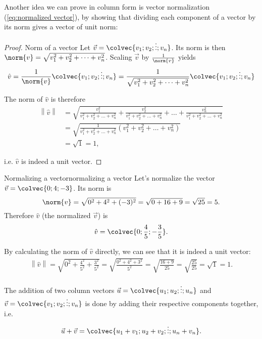 Another idea we can prove in column form is vector normalization (\autoref{eq:normalized vector}), by showing that dividing each component of a vector by its norm gives a vector of unit norm:
\begin{proof}{Norm of a vector}{}
	Let $\vec{v}=\colvec{v_{1};v_{2};\vdots;v_{n}}$. Its norm is then $\norm{v}=\sqrt{v_{1}^{2}+v_{2}^{2}+\dots+v_{n}^{2}}$. Scaling $\vec{v}$ by $\frac{1}{\norm{v}}$ yields
	\begin{equation*}
		\hat{v} = \frac{1}{\norm{v}}\colvec{v_{1};v_{2};\vdots;v_{n}} = \frac{1}{\sqrt{v_{1}^{2}+v_{2}^{2}+\dots+v_{n}^{2}}}\colvec{v_{1};v_{2};\vdots;v_{n}}
	\end{equation*}

	The norm of $\hat{v}$ is therefore
	\begin{align*}
		\left\| \hat{v} \right\| &= \sqrt{\frac{v_{1}^{2}}{v_{1}^{2}+v_{2}^{2}+\dots+v_{n}^{2}} + \frac{v_{2}^{2}}{v_{1}^{2}+v_{2}^{2}+\dots+v_{n}^{2}} + \dots + \frac{v_{n}^{2}}{v_{1}^{2}+v_{2}^{2}+\dots+v_{n}^{2}}}\\
		&= \sqrt{\frac{1}{v_{1}^{2}+v_{2}^{2}+\dots+v_{n}^{2}}\left(v_{1}^{2}+v_{2}^{2}+\dots+v_{n}^{2} \right)}\\
		&= \sqrt{1} = 1,
	\end{align*}

	i.e. $\hat{v}$ is indeed a unit vector.
\end{proof}

\begin{example}{Normalizing a vector}{normalizing a vector}
	Let's normalize the vector $\vec{v}=\colvec{0;4;-3}$. Its norm is
	\[
		\norm{v} = \sqrt{0^{2}+4^{2}+(-3)^{2}} = \sqrt{0+16+9} = \sqrt{25} = 5.
	\]
	Therefore $\hat{v}$ (the normalized $\vec{v}$) is
	\[
		\hat{v} = \colvec{0;\frac{4}{5};-\frac{3}{5}}.
	\]

	By calculating the norm of $\hat{v}$ directly, we can see that it is indeed a unit vector:
	\begin{align*}
		\left\|\hat{v}\right\| = \sqrt{0^{2} + \frac{4^{2}}{5^{2}} + \frac{3^{2}}{5^{2}}} = \sqrt{\frac{0^{2}+4^{2}+3^{2}}{5^{2}}} = \sqrt{\frac{16+9}{25}} = \sqrt{\frac{25}{25}} = \sqrt{1} = 1.
	\end{align*}
\end{example}

The addition of two column vectors $\vec{u}=\colvec{u_{1};u_{2};\vdots;u_{n}}$ and $\vec{v}=\colvec{v_{1};v_{2};\vdots;v_{n}}$ is done by adding their respective components together, i.e.
\begin{equation}
	\vec{u} + \vec{v} = \colvec{u_{1}+v_{1};u_{2}+v_{2};\vdots;u_{n}+v_{n}}.
	\label{eq:adding vectors}
\end{equation}

